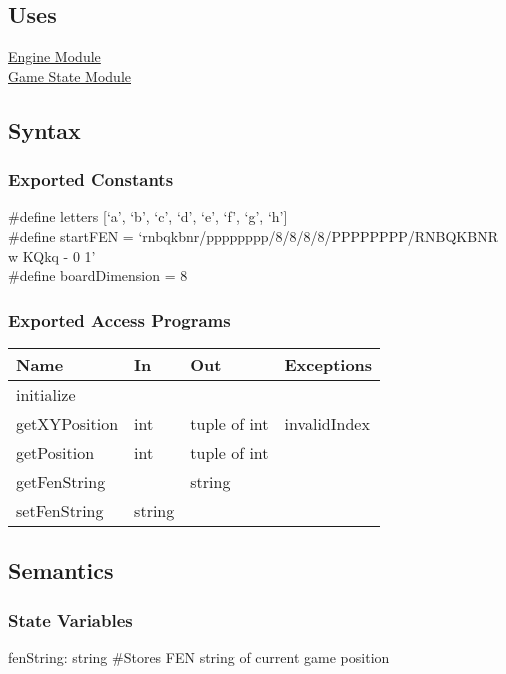 \documentclass[12pt, titlepage]{article}
\begin{document}
    \subsection{Uses}
    \hyperref[mEngine]{Engine Module}\\
    \hyperref[mGame]{Game State Module}

    \subsection{Syntax}
    \subsubsection{Exported Constants}
        \#define letters [`a', `b', `c', `d', `e', `f', `g', `h']\\
        \#define startFEN = `rnbqkbnr/pppppppp/8/8/8/8/PPPPPPPP/RNBQKBNR w KQkq - 0 1'\\
        \#define boardDimension = 8

    \subsubsection{Exported Access Programs}
        \begin{center}
        \begin{tabular}{p{4.5cm} p{4cm} p{3cm} p{2.5cm}}
        \hline
        \textbf{Name} & \textbf{In} & \textbf{Out} & \textbf{Exceptions} \\
        \hline
        initialize & & & \\
        \hline
        getXYPosition & int & tuple of int & invalidIndex\\
        \hline
        getPosition & int & tuple of int & \\
        \hline
        getFenString & & string & \\
        \hline
        setFenString & string & & \\
        \hline
        \end{tabular}
        \end{center}

    \subsection{Semantics}
    \subsubsection{State Variables}
    fenString: string \#Stores FEN string of current game position
\end{document}
